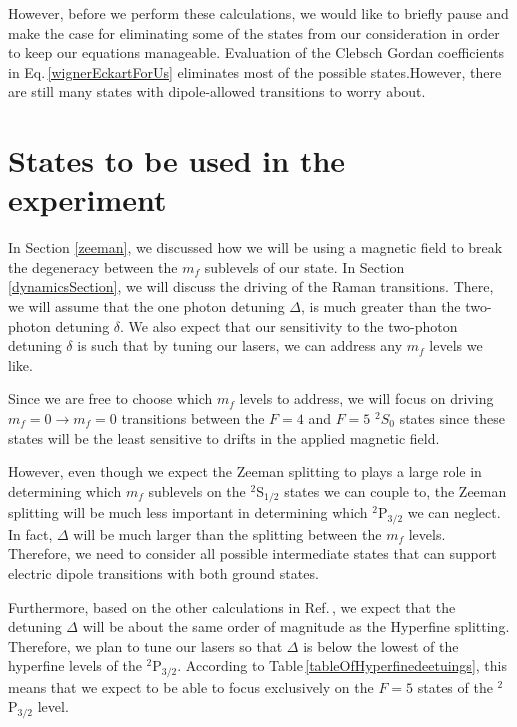 However, before we perform these calculations, we would like to briefly pause and make the case for eliminating some of the states from our consideration in order to keep our equations manageable. 
Evaluation of the Clebsch Gordan coefficients in Eq.\,\ref{wignerEckartForUs} eliminates most of the possible states.However, there are still many states with dipole-allowed transitions to worry about. 

\section{States to be used in the experiment}
\label{figureOutStatesSection}

In Section \ref{zeeman}, we discussed how we will be using a magnetic field to break the degeneracy between the $m_f$ sublevels of our state.
In Section \ref{dynamicsSection}, we will discuss the driving of the Raman transitions. There, we will assume that the one photon detuning $\Delta$, is much greater than the two-photon detuning $\delta$. We also expect that our sensitivity to the two-photon detuning $\delta$ is such that by tuning our lasers, we can address any $m_f$ levels we like.

Since we are free to choose which $m_f$ levels to address, we will focus on driving $m_f=0\rightarrow m_f=0$ transitions between the $F=4$ and $F=5$ $^2 S_{0}$ states since these states will be the least sensitive to drifts in the applied magnetic field. 

However, even though we expect the Zeeman splitting to plays a large role in determining which $m_f$ sublevels on the $^2$S$_{1/2}$ states we can couple to, the Zeeman splitting will be much less important in determining which $^2$P$_{3/2}$ we can neglect. In fact, $\Delta$ will be much larger than the splitting between the $m_f$ levels. Therefore, we need to consider all possible intermediate states that can support electric dipole transitions with both ground states. %


Furthermore, based on the other calculations in Ref.\,\cite{cjeDiss}, we expect that the detuning $\Delta$ will be about the same order of magnitude as the Hyperfine splitting. Therefore, we plan to tune our lasers so that $\Delta$ is below the lowest of the hyperfine levels of the $^2$P$_{3/2}$. According to Table\,\ref{tableOfHyperfinedeetuings}, this means that we expect to be able to focus exclusively on the $F=5$ states of the $^2$P$_{3/2}$ level.

